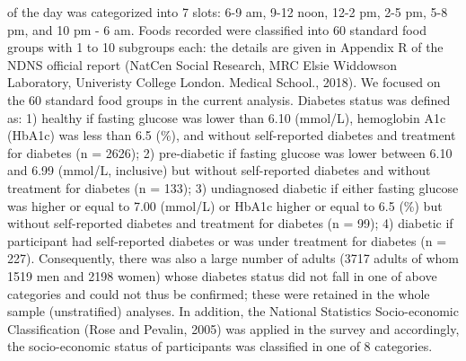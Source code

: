 \documentclass[utf8]{frontiersSCNS}
\providecommand{\DIFaddtex}[1]{{\protect\color{blue}\uwave{#1}}} %
\providecommand{\DIFaddend}{} %
\providecommand{\DIFadd}[1]{\texorpdfstring{\DIFaddtex{#1}}{#1}} %
\DeclareRobustCommand{\DIFaddend}{\DIFOaddend \let\includegraphics\DIFOincludegraphics} %
\begin{document}
\DIFadd{In the food diary recordings, time }\DIFaddend of the day was categorized into 7
slots: 6-9 am, 9-12 noon, 12-2 pm, 2-5 pm, 5-8 pm, and 10 pm - 6 am.
Foods recorded were classified into 60 standard food groups with 1 to 10
subgroups each: the details are given in Appendix R of the NDNS official
report (NatCen Social Research, MRC Elsie Widdowson Laboratory,
Univeristy College London. Medical School., 2018). We focused on the 60
standard food groups in the current analysis. Diabetes status was
defined as: 1) healthy if fasting glucose was lower than 6.10 (mmol/L),
hemoglobin A1c (HbA1c) was less than 6.5 (\%), and without self-reported
diabetes and treatment for diabetes (n = 2626); 2) pre-diabetic if
fasting glucose was lower between 6.10 and 6.99 (mmol/L, inclusive) but
without self-reported diabetes and without treatment for diabetes (n =
133); 3) undiagnosed diabetic if either fasting glucose was higher or
equal to 7.00 (mmol/L) or HbA1c higher or equal to 6.5 (\%) but without
self-reported diabetes and treatment for diabetes (n = 99); 4) diabetic
if participant had self-reported diabetes or was under treatment for
diabetes (n = 227). Consequently, there was also a large number of
adults (3717 adults of whom 1519 men and 2198 women) whose diabetes
status did not fall in one of above categories and could not thus be
confirmed; these were retained in the whole sample (unstratified)
analyses. In addition, the National Statistics Socio-economic
Classification (Rose and Pevalin, 2005) was applied in the survey and
accordingly, the socio-economic status of participants was classified in
one of 8 categories.
\end{document}
